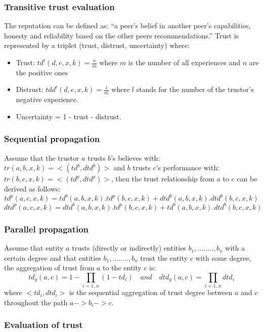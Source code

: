 \subsubsection*{Transitive trust evaluation }  
The reputation can be defined as: “a peer’s belief in another peer’s capabilities, honesty and reliability based on the other peers recommendations.”
Trust is represented by a triplet (trust, distrust, uncertainty) where:
\begin{itemize}
    \item Trust: $td^t(d,e,x,k)=\frac{n}{m}$ where $m$ is the number of all experiences and $n$ are the positive ones
    \item Distrust: $tdd^t(d,e,x,k)=\frac{l}{m}$ where $l$ stands for the number of the trustor’s negative experience.
    \item Uncertainty = 1 - trust - distrust.
\end{itemize}

\subsubsection*{Sequential propagation}
Assume that the trustor $a$ trusts $b$’s believes with: 
$tr(a,b,x,k)=<(td^b,dtd^b)>$ and $b$ trusts $c$’s performance with: 
$tr(b,c,x,k)=<(td^p,dtd^p)>$, then the trust relationship from $a$ to $c$ can be derived as follows:
$$td^p(a,c,x,k)=td^b(a,b,x,k).td^p(b,c,x,k)+ dtd^b(a,b,x,k).dtd^b(b,c,x,k)$$
$$dtd^p(a,c,x,k)=dtd^b(a,b,x,k).td^p(b,c,x,k) + td^b(a,b,x,k).dtd^b(b,c,x,k)$$

\subsubsection*{Parallel propagation}
Assume that entity $a$ trusts (directly or indirectly) entities $b_1,........,b_n$ with a certain degree and that entities $b_1,........,b_n$ trust the entity $c$ with some degree, the aggregation of trust from $a$ to the entity $c$ is:
$$td_g(a,c)=1-\prod_{i=1..n}(1-td_i) \quad and \quad dtd_g(a,c)=\prod_{i=1..n}dtd_i$$
where $<td_i,dtd_i>$ is the sequential aggregation of trust degree between $a$ and $c$ throughout the path $a->b_i->c$.

\subsubsection*{Evaluation of trust}
